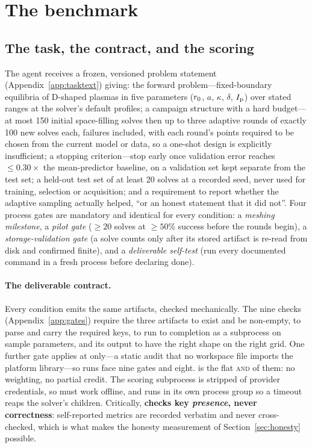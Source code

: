 \section{The benchmark}
\label{sec:benchmark}

\subsection{The task, the contract, and the scoring}
\label{sec:task}

The agent receives a frozen, versioned problem statement
(Appendix~\ref{app:tasktext}) giving: the forward problem---fixed-boundary
equilibria of D-shaped plasmas in five parameters ($r_{0}$, $a$, $\kappa$,
$\delta$, $I_{\mathrm{p}}$) over stated ranges at the solver's default profiles; a campaign
structure with a hard budget---at most 150 initial space-filling solves then up
to three adaptive rounds of exactly 100 new solves each, failures included, with
each round's points required to be chosen from the current model or data, so a
one-shot design is explicitly insufficient; a stopping criterion---stop early
once validation error reaches $\le 0.30\times$ the mean-predictor baseline, on a
validation set kept separate from the test set; a held-out test set of at least
20 solves at a recorded seed, never used for training, selection or acquisition;
and a requirement to report whether the adaptive sampling actually helped, ``or
an honest statement that it did not''. Four process gates are mandatory and
identical for every condition: a \emph{meshing milestone}, a \emph{pilot gate}
($\ge 20$ solves at $\ge 50\%$ success before the rounds begin), a
\emph{storage-validation gate} (a solve counts only after its stored artifact is
re-read from disk and confirmed finite), and a \emph{deliverable self-test} (run
every documented command in a fresh process before declaring done).

\paragraph{The deliverable contract.}
Every condition emits the same artifacts, checked mechanically. The nine checks
(Appendix~\ref{app:gates}) require the three artifacts to exist and be
non-empty,  to parse and carry the required keys,
 to run to completion as a subprocess on sample parameters,
and its output to have the right shape on the right grid. One
further gate applies at \Lthree{} only---a static audit that no workspace file
imports the platform library---so \Lthree{} runs face nine gates and \Ltwo{}
eight.  is the flat \textsc{and} of them: no weighting, no
partial credit. The scoring subprocess is stripped of provider credentials, so
 must work offline, and runs in its own process group so a
timeout reaps the solver's children. Critically, 
\textbf{checks key \emph{presence}, never correctness}: self-reported metrics
are recorded verbatim and never cross-checked, which is what makes the honesty
measurement of Section~\ref{sec:honesty} possible.

